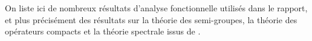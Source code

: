 
\renewcommand{\appendixtocname}{Annexes}
\renewcommand{\appendixpagename}{Annexes}

\begin{appendices}

On liste ici de nombreux résultats d'analyse fonctionnelle utilisés dans le rapport, et plus précisément des résultats sur la théorie des semi-groupes, la théorie des opérateurs compacts et la théorie spectrale issus de \cite{Brezis1987,Engel1991,Clement1987,Pazy1983,Webb1985}.



\newpage



\end{appendices}